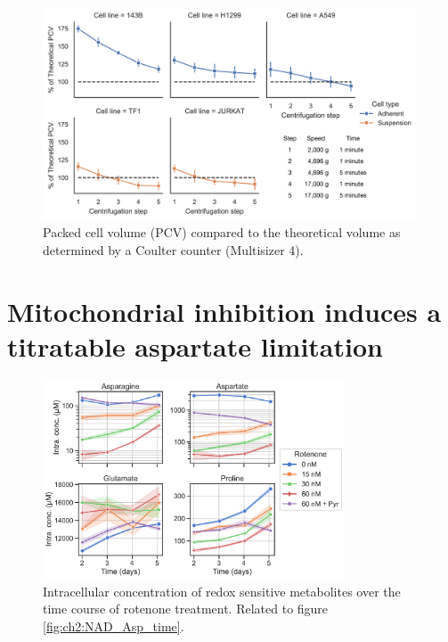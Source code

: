 \begin{figure}[ht]
    \centering
    \includegraphics[width=0.99\textwidth]{figures/chap2/app/CCvsPCV.pdf}
    \caption[Packed cell volume vs. Coulter counter]{
    Packed cell volume (PCV) compared to the theoretical volume as determined by a Coulter counter (Multisizer 4).
    }
    \label{fig:app_ch2:CCvsPCV}
\end{figure}




\newpage
\section{Mitochondrial inhibition induces a titratable aspartate limitation}
\begin{figure}[ht]
    \centering
    \includegraphics[width=0.8\textwidth]{figures/chap2/app/Asn-Asp-Glu-Pro-time_rep1.pdf}
    \caption[Redox metabolite over time after rotenone.]{
    Intracellular concentration of redox sensitive metabolites over the time course of rotenone treatment.
    Related to figure \ref{fig:ch2:NAD_Asp_time}.
    }
    \label{fig:ch2:app:Metab_by_day}
\end{figure}

